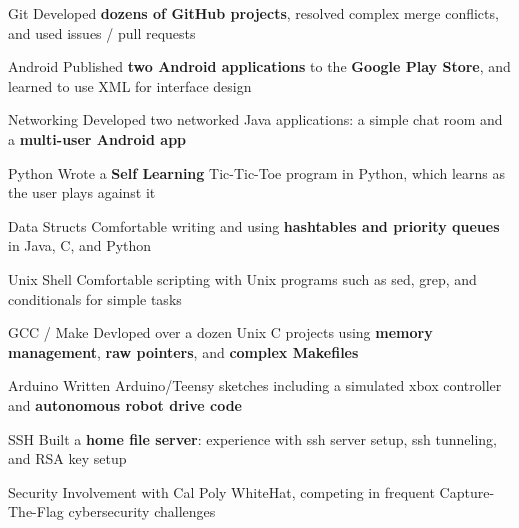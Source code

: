 




\begin{cvskills}

 \cvskill
    {Git} %
    {Developed \textbf{dozens of GitHub projects}, resolved complex merge conflicts, and used issues / pull requests} %

 \cvskill
    {Android} %
    {Published \textbf{two Android applications} to the \textbf{Google Play Store}, and learned to use XML for interface design} %

 \cvskill
    {Networking} %
    {Developed two networked Java applications: a simple chat room and a \textbf{multi-user Android app}} %
 
 \cvskill
    {Python} %
    {Wrote a \textbf{Self Learning} Tic-Tic-Toe program in Python, which learns as the user plays against it} %

 \cvskill
    {Data Structs} %
    {Comfortable writing and using \textbf{hashtables and priority queues} in Java, C, and Python} %

 \cvskill
    {Unix Shell} %
    {Comfortable scripting with Unix programs such as sed, grep, and conditionals for simple tasks} %

 \cvskill
    {GCC / Make} %
    {Devloped over a dozen Unix C projects using \textbf{memory management}, \textbf{raw pointers}, and \textbf{complex Makefiles}} %

 \cvskill
    {Arduino} %
    {Written Arduino/Teensy sketches including a simulated xbox controller and \textbf{autonomous robot drive code}} %

 \cvskill
    {SSH} %
    {Built a \textbf{home file server}: experience with ssh server setup, ssh tunneling, and RSA key setup} %

 \cvskill
    {Security} %
    {Involvement with Cal Poly WhiteHat, competing in frequent Capture-The-Flag cybersecurity challenges} %


\end{cvskills}

